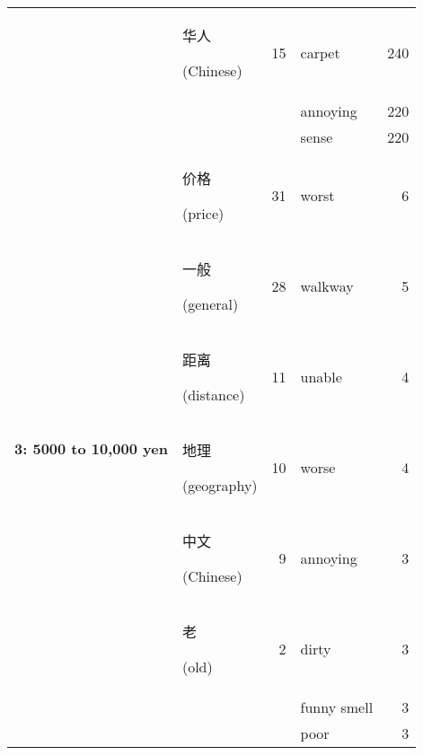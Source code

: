 \documentclass[smallextended,natbib]{svjour3}       %
\begin{document}
\begin{table}[ht]
{\begin{tabular}{|c|lr|lr|}
                                                             & \begin{CJK}{UTF8}{gbsn}华人\end{CJK} (Chinese)   & 15   & carpet         & 240 \\  
                                                             &                                                &      & annoying       & 220 \\  
                                                             &                                                &      & sense          & 220 \\ \hline
        \multirow{10}{*}{\textbf{3: 5000 to 10,000 yen}}     & \begin{CJK}{UTF8}{gbsn}价格\end{CJK} (price)     & 31   & worst          & 6   \\  
                                                             & \begin{CJK}{UTF8}{gbsn}一般\end{CJK} (general)   & 28   & walkway        & 5   \\  
                                                             & \begin{CJK}{UTF8}{gbsn}距离\end{CJK} (distance)  & 11   & unable         & 4   \\  
                                                             & \begin{CJK}{UTF8}{gbsn}地理\end{CJK} (geography) & 10   & worse          & 4   \\  
                                                             & \begin{CJK}{UTF8}{gbsn}中文\end{CJK} (Chinese)   & 9    & annoying       & 3   \\  
                                                             & \begin{CJK}{UTF8}{gbsn}老\end{CJK} (old)        & 2    & dirty          & 3   \\  
                                                             &                                                &      & funny smell    & 3   \\  
                                                             &                                                &      & poor           & 3   \\  

\end{tabular}}
\end{table}
\end{document}
